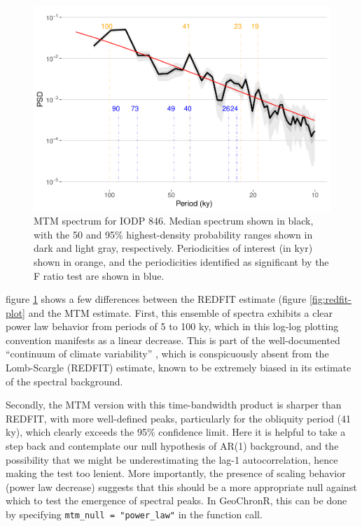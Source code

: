 \documentclass[gchron, manuscript]{copernicus}
\begin{document}
\begin{figure}
\includegraphics[width=12cm]{geoChronR-paper_files/figure-latex/mtm-ensemble-export-1} \caption{MTM spectrum for IODP 846. Median spectrum shown in black, with the 50 and 95\% highest-density probability ranges shown in dark and light gray, respectively. Periodicities of interest (in kyr) shown in orange, and the periodicities identified as significant by the F ratio test are shown in blue.}\label{fig:mtm-ensemble-export}
\end{figure}

figure \ref{fig:mtm-ensemble-export} shows a few differences between the REDFIT estimate (figure \ref{fig:redfit-plot} and the MTM estimate. First, this ensemble of spectra exhibits a clear power law behavior from periods of 5 to 100 ky, which in this log-log plotting convention manifests as a linear decrease.
This is part of the well-documented ``continuum of climate variability'' \citep{Huybers_Curry2006, ZhuPNAS2019}, which is conspicuously absent from the Lomb-Scargle (REDFIT) estimate, known to be extremely biased in its estimate of the spectral background.

Secondly, the MTM version with this time-bandwidth product is sharper than REDFIT, with more well-defined peaks, particularly for the obliquity period (41 ky), which clearly exceeds the 95\% confidence limit.
Here it is helpful to take a step back and contemplate our null hypothesis of AR(1) background, and the possibility that we might be underestimating the lag-1 autocorrelation, hence making the test too lenient.
More importantly, the presence of scaling behavior (power law decrease) suggests that this should be a more appropriate null against which to test the emergence of spectral peaks.
In GeoChronR, this can be done by specifying \texttt{mtm\_null\ =\ "power\_law"} in the function call.
\end{document}
